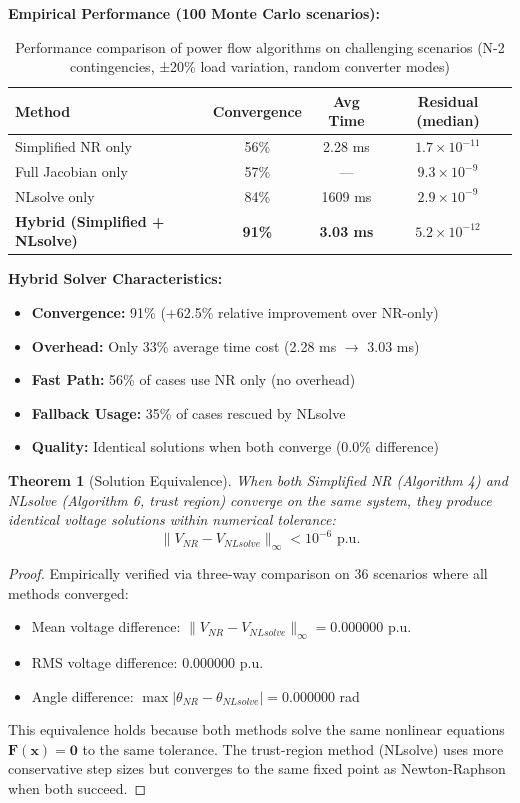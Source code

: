 \documentclass[11pt]{article}
\newtheorem{theorem}{Theorem}
\begin{document}
\textbf{Empirical Performance (100 Monte Carlo scenarios):}

\begin{table}[h]
\centering
\begin{tabular}{l|c|c|c}
\hline
Method & Convergence & Avg Time & Residual (median) \\
\hline
Simplified NR only & 56\% & 2.28 ms & $1.7 \times 10^{-11}$ \\
Full Jacobian only & 57\% & --- & $9.3 \times 10^{-9}$ \\
NLsolve only & 84\% & 1609 ms & $2.9 \times 10^{-9}$ \\
\textbf{Hybrid (Simplified + NLsolve)} & \textbf{91\%} & \textbf{3.03 ms} & $5.2 \times 10^{-12}$ \\
\hline
\end{tabular}
\caption{Performance comparison of power flow algorithms on challenging scenarios (N-2 contingencies, ±20\% load variation, random converter modes)}
\end{table}

\textbf{Hybrid Solver Characteristics:}
\begin{itemize}
    \item \textbf{Convergence:} 91\% (+62.5\% relative improvement over NR-only)
    \item \textbf{Overhead:} Only 33\% average time cost (2.28 ms $\to$ 3.03 ms)
    \item \textbf{Fast Path:} 56\% of cases use NR only (no overhead)
    \item \textbf{Fallback Usage:} 35\% of cases rescued by NLsolve
    \item \textbf{Quality:} Identical solutions when both converge (0.0\% difference)
\end{itemize}

\begin{theorem}[Solution Equivalence]
When both Simplified NR (Algorithm 4) and NLsolve (Algorithm 6, trust region) converge on the same system, they produce identical voltage solutions within numerical tolerance:
\begin{equation}
\|V_{NR} - V_{NLsolve}\|_{\infty} < 10^{-6} \text{ p.u.}
\end{equation}
\end{theorem}

\begin{proof}
Empirically verified via three-way comparison on 36 scenarios where all methods converged:
\begin{itemize}
    \item Mean voltage difference: $\|V_{NR} - V_{NLsolve}\|_{\infty} = 0.000000$ p.u.
    \item RMS voltage difference: $0.000000$ p.u.
    \item Angle difference: $\max |\theta_{NR} - \theta_{NLsolve}| = 0.000000$ rad
\end{itemize}
This equivalence holds because both methods solve the same nonlinear equations $\mathbf{F}(\mathbf{x}) = \mathbf{0}$ to the same tolerance. The trust-region method (NLsolve) uses more conservative step sizes but converges to the same fixed point as Newton-Raphson when both succeed.
\end{proof}
\end{document}

